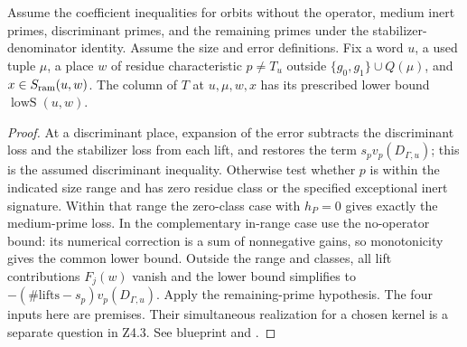 
\begin{theorem}\label{pn:P047}
Assume the coefficient inequalities for orbits without the operator, medium inert primes, discriminant primes, and the remaining primes under the stabilizer-denominator identity. Assume the size and error definitions. Fix a word \(u\), a used tuple \(\mu\), a place \(w\) of residue characteristic \(p\ne T_u\) outside \(\{g_0,g_1\}\cup Q(\mu)\), and \(x\in S_{\rm ram}(u,w)\). The column of \(T\) at \(u,\mu,w,x\) has its prescribed lower bound \(\operatorname{lowS}(u,w)\).
\end{theorem}
\begin{proof}
At a discriminant place, expansion of the error subtracts the discriminant loss and the stabilizer loss from each lift, and restores the term \(s_pv_p(D_{\Gamma,u})\); this is the assumed discriminant inequality. Otherwise test whether \(p\) is within the indicated size range and has zero residue class or the specified exceptional inert signature. Within that range the zero-class case with \(h_P=0\) gives exactly the medium-prime loss. In the complementary in-range case use the no-operator bound: its numerical correction is a sum of nonnegative gains, so monotonicity gives the common lower bound. Outside the range and classes, all lift contributions \(F_j(w)\) vanish and the lower bound simplifies to \(-(\#\mathrm{lifts}-s_p)v_p(D_{\Gamma,u})\). Apply the remaining-prime hypothesis. The four inputs here are premises. Their simultaneous realization for a chosen kernel is a separate question in Z4.3. See blueprint  and .
\end{proof}
